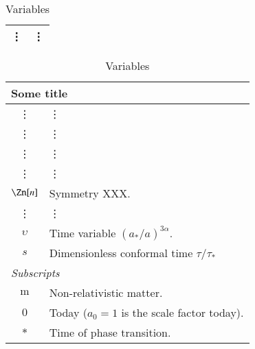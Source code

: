 \begin{table}[h]
\begin{minipage}{0.5\linewidth}
{{\begin{tabular*}{\linewidth}{c l}
            \vdots & \vdots\\
            \bottomrule
        \end{tabular*}
        }}
    \end{minipage}\hfill
    \begin{minipage}{0.5\linewidth}
        {\small{
        \begin{tabular*}{\linewidth}{c l}
            \multicolumn{2}{l}{\textsf{Some title}} \\
            \toprule
            \vdots & \vdots \\
            \vdots & \vdots \\
            \vdots & \vdots \\
            \vdots & \vdots \\
            $\Zn[n]$ & Symmetry XXX. \\
            \vdots & \vdots \\
            $\upsilon$ &  Time variable $(a_\ast/a)^{3\alpha}$. \\
            $s$ &  Dimensionless conformal time $\tau/\tau_\ast$  \\
            \midrule
            \multicolumn{2}{l}{\textit{Subscripts}} \\
            \midrule
            $\mathrm{m}$ & Non-relativistic matter. \\
            $0$ & Today ($a_0=1$ is the scale factor today). \\
            $*$ & Time of phase transition. \\
            \bottomrule
        \end{tabular*}
        }}
    \end{minipage}
    \caption{Variables \blahblah}
\end{table}










